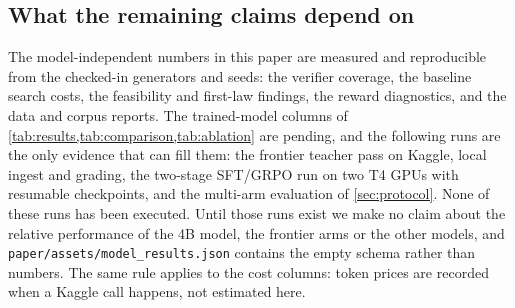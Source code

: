 \subsection{What the remaining claims depend on}\label{sec:status}
The model-independent numbers in this paper are measured and reproducible from the checked-in generators and seeds: the verifier coverage, the baseline search costs, the feasibility and first-law findings, the reward diagnostics, and the data and corpus reports. The trained-model columns of \cref{tab:results,tab:comparison,tab:ablation} are pending, and the following runs are the only evidence that can fill them: the frontier teacher pass on Kaggle, local ingest and grading, the two-stage SFT/GRPO run on two T4 GPUs with resumable checkpoints, and the multi-arm evaluation of \cref{sec:protocol}. None of these runs has been executed. Until those runs exist we make no claim about the relative performance of the 4B model, the frontier arms or the other models, and \texttt{paper/assets/model\_results.json} contains the empty schema rather than numbers. The same rule applies to the cost columns: token prices are recorded when a Kaggle call happens, not estimated here.
